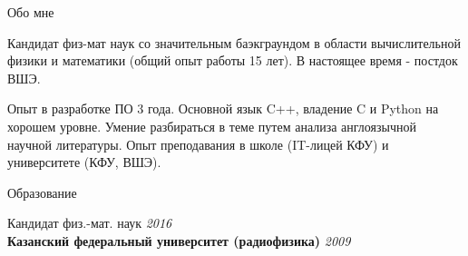\documentclass[
	a4paper, %
	11pt, %
]{resume} %
\begin{document}

\begin{rSection}{Обо мне}
	\item Кандидат физ-мат наук со значительным баэкграундом в области вычислительной физики и математики
	(общий опыт работы 15 лет). В настоящее время - постдок ВШЭ.
	\item Опыт в разработке ПО 3 года. Основной язык C++, владение C и
	Python на хорошем уровне. Умение разбираться в теме путем анализа англоязычной научной литературы. Опыт преподавания в школе (IT-лицей КФУ) и университете (КФУ, ВШЭ).
\end{rSection}

\begin{rSection}{Образование}

	Кандидат физ.-мат. наук \hfill \textit{2016} \\
	\textbf{Казанский федеральный университет (радиофизика)} \hfill \textit{2009} \\

\end{rSection}

\end{document}
